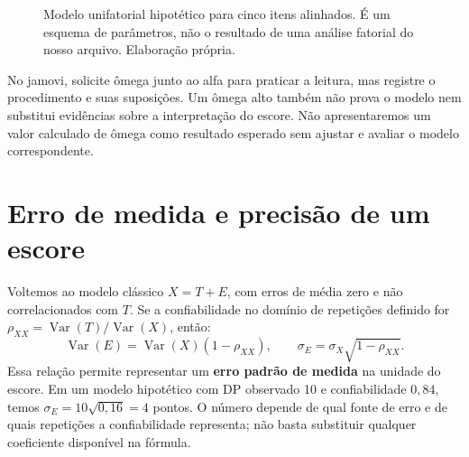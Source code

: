 \begin{figure}[H]
\centering
{}
\caption{Modelo unifatorial hipotético para cinco itens alinhados. É um esquema de parâmetros, não o resultado de uma análise fatorial do nosso arquivo. Elaboração própria.}
\label{fig:modelo-medida}
\end{figure}

No jamovi, solicite ômega junto ao alfa para praticar a leitura, mas registre o procedimento e suas suposições. Um ômega alto também não prova o modelo nem substitui evidências sobre a interpretação do escore. Não apresentaremos um valor calculado de ômega como resultado esperado sem ajustar e avaliar o modelo correspondente.

\section{Erro de medida e precisão de um escore}
\label{sec:erro-medida-escore}

Voltemos ao modelo clássico $X=T+E$, com erros de média zero e não correlacionados com $T$. Se a confiabilidade no domínio de repetições definido for $\rho_{XX}=\operatorname{Var}(T)/\operatorname{Var}(X)$, então:
\[
\operatorname{Var}(E)=\operatorname{Var}(X)(1-\rho_{XX}),
\qquad \sigma_E=\sigma_X\sqrt{1-\rho_{XX}}.
\]
Essa relação permite representar um \textbf{erro padrão de medida} na unidade do escore. Em um modelo hipotético com DP observado 10 e confiabilidade $0{,}84$, temos $\sigma_E=10\sqrt{0{,}16}=4$ pontos. O número depende de qual fonte de erro e de quais repetições a confiabilidade representa; não basta substituir qualquer coeficiente disponível na fórmula.

